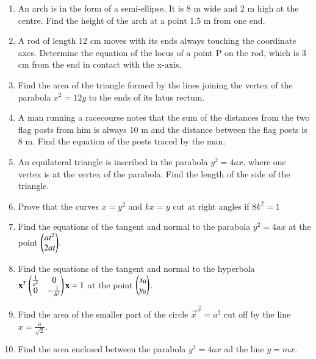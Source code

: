 \begin{enumerate}[label=\arabic*.,ref=\thesubsection.\theenumi]
\item An arch is in the form of a semi-ellipse. It is 8 m wide and 2 m high at the centre. Find the height of the arch at a point 1.5 m from one end.
\item A rod of length 12 cm moves with its ends always touching the coordinate axes. Determine the equation of the locus of a point P on the rod, which is 3 cm from the end in contact with the x-axis.
\item Find the area of the triangle formed by the lines joining the vertex of the parabola $x^2= 12y$ to the ends of its latus rectum.
\item A man running a racecourse notes that the sum of the distances from the two flag posts from him is always 10 m and the distance between the flag posts is 8 m. Find the equation of the posts traced by the man.
\item An equilateral triangle is inscribed in the parabola $y^2 = 4 ax$, where one vertex is at the vertex of the parabola. Find the length of the side of the triangle.
%
%
 \item Prove that the curves $x = y^2$ and $kx=y$ cut at right angles if $8k^2 = 1$

\item Find the equations of the tangent and normal to the parabola 
$y^2 = 4ax$ at the point $\begin{pmatrix}at^2\\2at\end{pmatrix}$.
\item Find the equations of the tangent and normal to the hyperbola 
$
\mathbf{x}^T\begin{pmatrix}\frac{1}{a^2} & 0 \\ 0 & -\frac{1}{b^2}\end{pmatrix}\mathbf{x} = 1
$
at the point $\begin{pmatrix}x_0\\ y_0 \end{pmatrix}$.
\item  Find the area of the smaller part of the circle $\vec{x}^\vec{x}=a^2$ cut off by the line $x = \frac{a}{\sqrt{2}}$.
\item Find the area enclosed between the parabola $y^2=4ax$ ad the line $y = mx$.

\end{enumerate}
